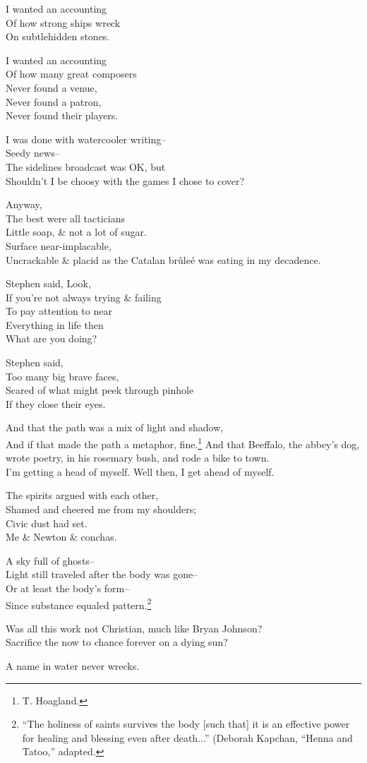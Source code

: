 I wanted an accounting \\
Of how strong ships wreck \\
On subtlehidden stones. 

I wanted an accounting \\
Of how many great composers \\
Never found a venue, \\
Never found a patron, \\
Never found their players.

I was done with watercooler writing-- \\
Seedy news-- \\
The sidelines broadcast was OK, but \\
Shouldn't I be choosy with the games I chose to cover?

Anyway, \\
The best were all tacticians \\
Little soap, \& not a lot of sugar. \\
Surface near-implacable, \\
Uncrackable \& placid as the Catalan brûleé was eating in my decadence. 

Stephen said, Look, \\
If you're not always trying \& failing \\
To pay attention to near \\
Everything in life then \\
What are you doing?

Stephen said, \\
Too many big brave faces, \\
Scared of what might peek through pinhole \\
If they close their eyes.

And that the path was a mix of light and shadow, \\
And if that made the path a metaphor, fine.\footnote{T. Hoagland.}
And that Beeffalo, the abbey's dog, wrote poetry, in his rosemary bush, and rode a bike to town. \\
I'm getting a head of myself. Well then, I get ahead of myself.

The spirits argued with each other, \\
Shamed and cheered me from my shoulders; \\
Civic dust had set. \\
Me \& Newton \& conchas.

A sky full of ghosts-- \\
Light still traveled after the body was gone-- \\
Or at least the body's form-- \\
Since substance equaled pattern.\footnote{``The holiness of saints survives the body [such that] it is an effective power for healing and blessing even after death...'' (Deborah Kapchan, ``Henna and Tatoo,'' adapted.}

Was all this work not Christian, much like Bryan Johnson? \\
Sacrifice the now to chance forever on a dying sun?

A name in water never wrecks.